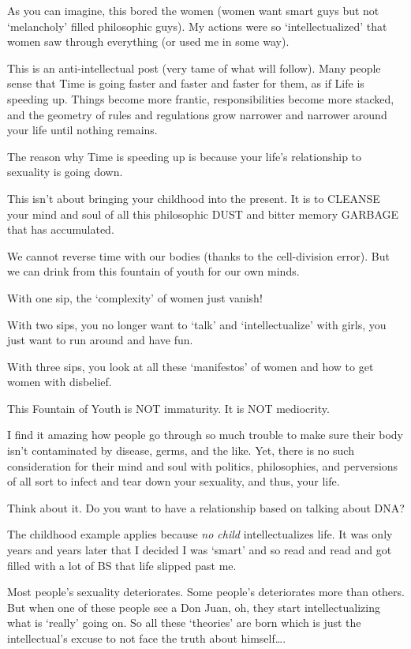 			As you can imagine, this bored the women (women want smart guys but not `melancholy' filled philosophic guys). My actions were so `intellectualized' that women saw through everything (or used me in some way).

			This is an anti-intellectual post (very tame of what will follow). Many people sense that Time is going faster and faster and faster for them, as if Life is speeding up. Things become more frantic, responsibilities become more stacked, and the geometry of rules and regulations grow narrower and narrower around your life until nothing remains.

			The reason why Time is speeding up is because your life's relationship to sexuality is going down.

			This isn't about bringing your childhood into the present. It is to CLEANSE your mind and soul of all this philosophic DUST and bitter memory GARBAGE that has accumulated.

			We cannot reverse time with our bodies (thanks to the cell-division error). But we can drink from this fountain of youth for our own minds.

			With one sip, the `complexity' of women just vanish!

			With two sips, you no longer want to `talk' and `intellectualize' with girls, you just want to run around and have fun.

			With three sips, you look at all these `manifestos' of women and how to get women with disbelief.

			This Fountain of Youth is NOT immaturity. It is NOT mediocrity.

			I find it amazing how people go through so much trouble to make sure their body isn't contaminated by disease, germs, and the like. Yet, there is no such consideration for their mind and soul with politics, philosophies, and perversions of all sort to infect and tear down your sexuality, and thus, your life.

			Think about it. Do you want to have a relationship based on talking about DNA?

			The childhood example applies because \textit{no child} intellectualizes life. It was only years and years later that I decided I was `smart' and so read and read and got filled with a lot of BS that life slipped past me.

			Most people's sexuality deteriorates. Some people's deteriorates more than others. But when one of these people see a Don Juan, oh, they start intellectualizing what is `really' going on. So all these `theories' are born which is just the intellectual's excuse to not face the truth about himself….

